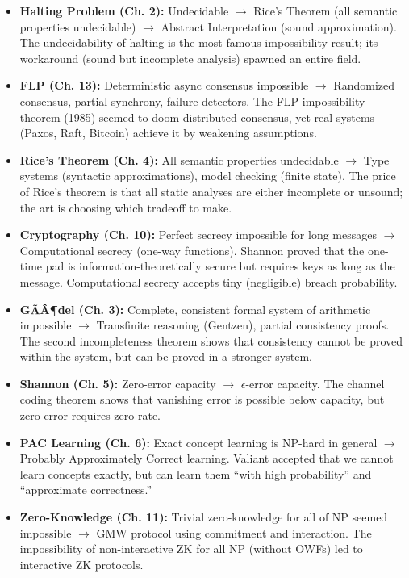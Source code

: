\begin{itemize}
\item \textbf{Halting Problem (Ch. 2):} Undecidable $\to$ Rice's Theorem (all semantic properties undecidable) $\to$ Abstract Interpretation (sound approximation). The undecidability of halting is the most famous impossibility result; its workaround (sound but incomplete analysis) spawned an entire field.

\item \textbf{FLP (Ch. 13):} Deterministic async consensus impossible $\to$ Randomized consensus, partial synchrony, failure detectors. The FLP impossibility theorem (1985) seemed to doom distributed consensus, yet real systems (Paxos, Raft, Bitcoin) achieve it by weakening assumptions.

\item \textbf{Rice's Theorem (Ch. 4):} All semantic properties undecidable $\to$ Type systems (syntactic approximations), model checking (finite state). The price of Rice's theorem is that all static analyses are either incomplete or unsound; the art is choosing which tradeoff to make.

\item \textbf{Cryptography (Ch. 10):} Perfect secrecy impossible for long messages $\to$ Computational secrecy (one-way functions). Shannon proved that the one-time pad is information-theoretically secure but requires keys as long as the message. Computational secrecy accepts tiny (negligible) breach probability.

\item \textbf{GÃÂ¶del (Ch. 3):} Complete, consistent formal system of arithmetic impossible $\to$ Transfinite reasoning (Gentzen), partial consistency proofs. The second incompleteness theorem shows that consistency cannot be proved within the system, but can be proved in a stronger system.

\item \textbf{Shannon (Ch. 5):} Zero-error capacity $\to$ $\epsilon$-error capacity. The channel coding theorem shows that vanishing error is possible below capacity, but zero error requires zero rate.

\item \textbf{PAC Learning (Ch. 6):} Exact concept learning is NP-hard in general $\to$ Probably Approximately Correct learning. Valiant accepted that we cannot learn concepts exactly, but can learn them ``with high probability'' and ``approximate correctness.''

\item \textbf{Zero-Knowledge (Ch. 11):} Trivial zero-knowledge for all of NP seemed impossible $\to$ GMW protocol using commitment and interaction. The impossibility of non-interactive ZK for all NP (without OWFs) led to interactive ZK protocols.


\end{itemize}
